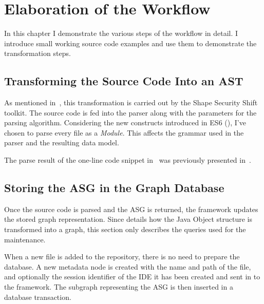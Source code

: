 \chapter{Elaboration of the Workflow}
\label{chap:elaboration-of-the-workflow}

In this chapter I demonstrate the various steps of the workflow in detail. I introduce small working source code examples and use them to demonstrate the transformation steps.

\section{Transforming the Source Code Into an AST}
As mentioned in~, this transformation is carried out by the Shape Security Shift toolkit. The source code is fed into the parser along with the parameters for the parsing algorithm. Considering the new constructs introduced in ES6 (), I've chosen to parse every file as a \emph{Module}. This affects the grammar used in the parser and the resulting data model.

The parse result of the one-line code snippet in~ was previously presented in~.

\begin{figure}[!htb]
	\begin{minipage}{\textwidth}
		
	\end{minipage}
\end{figure}

\section{Storing the ASG in the Graph Database}
Once the source code is parsed and the ASG is returned, the framework updates the stored graph representation. Since  details how the Java Object structure is transformed into a graph, this section only describes the queries used for the maintenance.

When a new file is added to the repository, there is no need to prepare the database. A new metadata node is created with the name and path of the file, and optionally the session identifier of the IDE it has been created and sent in to the framework. The subgraph representing the ASG is then inserted in a database transaction.

